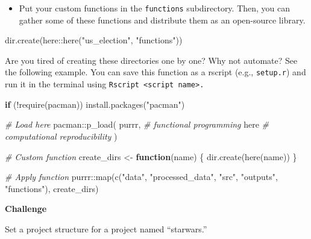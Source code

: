 \documentclass[
]{book}
\newenvironment{Shaded}{\begin{snugshade}}{\end{snugshade}}
\newcommand{\CommentTok}[1]{\textcolor[rgb]{0.56,0.35,0.01}{\textit{#1}}}
\newcommand{\ControlFlowTok}[1]{\textcolor[rgb]{0.13,0.29,0.53}{\textbf{#1}}}
\newcommand{\FunctionTok}[1]{\textcolor[rgb]{0.00,0.00,0.00}{#1}}
\newcommand{\NormalTok}[1]{#1}
\newcommand{\OtherTok}[1]{\textcolor[rgb]{0.56,0.35,0.01}{#1}}
\newcommand{\SpecialCharTok}[1]{\textcolor[rgb]{0.00,0.00,0.00}{#1}}
\newcommand{\StringTok}[1]{\textcolor[rgb]{0.31,0.60,0.02}{#1}}
\providecommand{\tightlist}{%
  \setlength{\itemsep}{0pt}\setlength{\parskip}{0pt}}
\begin{document}
\begin{itemize}
\tightlist
\item
  Put your custom functions in the \texttt{functions} subdirectory. Then, you can gather some of these functions and distribute them as an open-source library.
\end{itemize}

\begin{Shaded}
\begin{Highlighting}[]
\FunctionTok{dir.create}\NormalTok{(here}\SpecialCharTok{::}\FunctionTok{here}\NormalTok{(}\StringTok{"us\_election"}\NormalTok{, }\StringTok{"functions"}\NormalTok{))}
\end{Highlighting}
\end{Shaded}

Are you tired of creating these directories one by one? Why not automate? See the following example. You can save this function as a rscript (e.g., \texttt{setup.r}) and run it in the terminal using \texttt{Rscript\ \textless{}script\ name\textgreater{}.}

\begin{Shaded}
\begin{Highlighting}[]
\ControlFlowTok{if}\NormalTok{ (}\SpecialCharTok{!}\FunctionTok{require}\NormalTok{(pacman)) }\FunctionTok{install.packages}\NormalTok{(}\StringTok{"pacman"}\NormalTok{)}

\CommentTok{\# Load here}
\NormalTok{pacman}\SpecialCharTok{::}\FunctionTok{p\_load}\NormalTok{(}
\NormalTok{  purrr, }\CommentTok{\# functional programming}
\NormalTok{  here }\CommentTok{\# computational reproducibility}
\NormalTok{)}

\CommentTok{\# Custom function}
\NormalTok{create\_dirs }\OtherTok{\textless{}{-}} \ControlFlowTok{function}\NormalTok{(name) \{}
  \FunctionTok{dir.create}\NormalTok{(}\FunctionTok{here}\NormalTok{(name))}
\NormalTok{\}}

\CommentTok{\# Apply function }
\NormalTok{purrr}\SpecialCharTok{::}\FunctionTok{map}\NormalTok{(}\FunctionTok{c}\NormalTok{(}\StringTok{"data"}\NormalTok{, }\StringTok{"processed\_data"}\NormalTok{, }\StringTok{"src"}\NormalTok{, }\StringTok{"outputs"}\NormalTok{, }\StringTok{"functions"}\NormalTok{), create\_dirs)}
\end{Highlighting}
\end{Shaded}

\textbf{Challenge}

Set a project structure for a project named ``starwars.''
\end{document}
